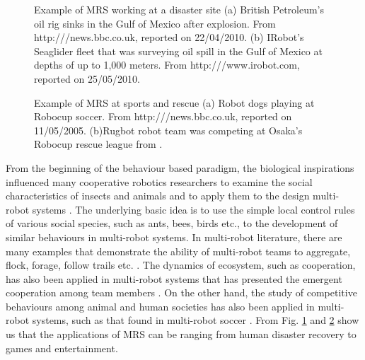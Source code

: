 \begin{figure}
\centering
{} 
\hspace{0.25cm}
\caption{Example of MRS working at a disaster site (a) British Petroleum's oil rig sinks in the Gulf of Mexico after explosion. From http:///news.bbc.co.uk, reported on 22/04/2010. 
(b) IRobot's Seaglider fleet that was surveying oil spill in the Gulf of Mexico at depths of up to 1,000 meters. From http:///www.irobot.com, reported on 25/05/2010.}
\label{fig:bp-oil-disaster}
\end{figure}
\begin{figure}
\centering
{} 
\hspace{0.25cm}
\caption{Example of MRS at sports and rescue (a) Robot dogs playing at Robocup soccer. From http:///news.bbc.co.uk, reported on 11/05/2005. 
(b)Rugbot robot team was competing at Osaka's Robocup rescue league from \protect{}.}
\label{fig:robocup}
\end{figure}
From the beginning of the behaviour based paradigm, the biological inspirations influenced many cooperative robotics researchers to examine the social characteristics of insects and animals and to apply them to the design multi-robot systems \cite{Arkin1998}. The underlying basic idea is to use the simple local control rules of various social species, such as ants, bees, birds etc., to the development of similar behaviours in multi-robot systems. In multi-robot literature, there are many examples that demonstrate the ability of multi-robot teams to aggregate, flock, forage, follow trails etc. \cite{Bonabeau+1999,Mataric1994}. The dynamics of ecosystem, such as cooperation, has also been applied in multi-robot systems that has presented the emergent cooperation among team members \cite{Mcfarland1994,Martinoli+1996}. On the other hand, the study of competitive behaviours among animal and human societies has also been applied in multi-robot systems, such as that found in multi-robot soccer \cite{Asada+1999}. From Fig. \ref{fig:bp-oil-disaster} and \ref{fig:robocup} show us that the applications of MRS can be ranging from human disaster recovery to games and entertainment.\\

